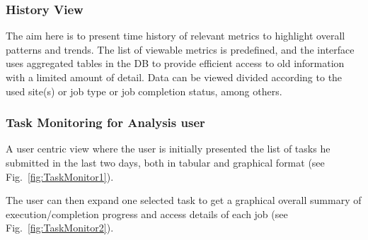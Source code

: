 \subsubsection{History View}
The aim here is to present time history of relevant
metrics to highlight overall patterns and trends.%
The list of viewable metrics is predefined, and
the interface uses aggregated tables in the DB to provide
efficient access to old information with a limited
amount of detail. Data can be viewed divided
according to the used site(s) or job type or job completion status, among others.

\subsubsection{Task Monitoring for Analysis user}
A user centric view where the user is
initially presented the list of tasks he submitted in the last
two days, both in tabular and graphical format (see Fig.~\ref{fig:TaskMonitor1}).

The user can then expand one selected task to get
a graphical overall summary of execution/completion progress
and access details of each job (see Fig.~\ref{fig:TaskMonitor2}).

